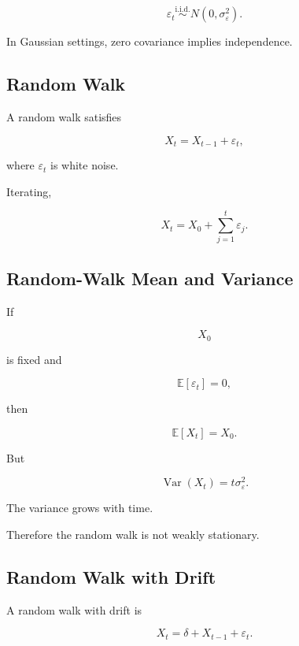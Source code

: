 \[
\boxed{
\varepsilon_t
\overset{\text{i.i.d.}}{\sim}
N
(
0,\sigma_\varepsilon^2
).
}
\]

In Gaussian settings, zero covariance implies independence.

\subsection{Random Walk}
\label{subsec:random-walk}

A random walk satisfies

\[
\boxed{
X_t
=
X_{t-1}
+
\varepsilon_t,
}
\]

where \(\varepsilon_t\) is white noise.

Iterating,

\[
\boxed{
X_t
=
X_0
+
\sum_{j=1}^{t}
\varepsilon_j.
}
\]

\subsection{Random-Walk Mean and Variance}
\label{subsec:random-walk-mean-variance}

If

\[
X_0
\]

is fixed and

\[
\mathbb{E}[\varepsilon_t]=0,
\]

then

\[
\boxed{
\mathbb{E}[X_t]
=
X_0.
}
\]

But

\[
\boxed{
\operatorname{Var}(X_t)
=
t\sigma_\varepsilon^2.
}
\]

The variance grows with time.

Therefore the random walk is not weakly stationary.

\subsection{Random Walk with Drift}
\label{subsec:random-walk-drift}

A random walk with drift is

\[
\boxed{
X_t
=
\delta
+
X_{t-1}
+
\varepsilon_t.
}
\]

